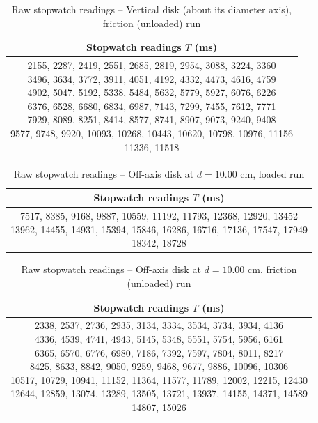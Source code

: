 \begin{table}[htb!]
\centering
\caption{Raw stopwatch readings -- Vertical disk (about its diameter axis), friction (unloaded) run}
\begin{tabular}{c}
\toprule
Stopwatch readings $T$ (\unit{\ms}) \\
\midrule
\makecell{2155, 2287, 2419, 2551, 2685, 2819, 2954, 3088, 3224, 3360 \\ 3496, 3634, 3772, 3911, 4051, 4192, 4332, 4473, 4616, 4759 \\ 4902, 5047, 5192, 5338, 5484, 5632, 5779, 5927, 6076, 6226 \\ 6376, 6528, 6680, 6834, 6987, 7143, 7299, 7455, 7612, 7771 \\ 7929, 8089, 8251, 8414, 8577, 8741, 8907, 9073, 9240, 9408 \\ 9577, 9748, 9920, 10093, 10268, 10443, 10620, 10798, 10976, 11156 \\ 11336, 11518} \\
\bottomrule
\end{tabular}
\end{table}
\begin{table}[htb!]
\centering
\caption{Raw stopwatch readings -- Off-axis disk at $d = 10.00$ cm, loaded run}
\begin{tabular}{c}
\toprule
Stopwatch readings $T$ (\unit{\ms}) \\
\midrule
\makecell{7517, 8385, 9168, 9887, 10559, 11192, 11793, 12368, 12920, 13452 \\ 13962, 14455, 14931, 15394, 15846, 16286, 16716, 17136, 17547, 17949 \\ 18342, 18728} \\
\bottomrule
\end{tabular}
\end{table}
\begin{table}[htb!]
\centering
\caption{Raw stopwatch readings -- Off-axis disk at $d = 10.00$ cm, friction (unloaded) run}
\begin{tabular}{c}
\toprule
Stopwatch readings $T$ (\unit{\ms}) \\
\midrule
\makecell{2338, 2537, 2736, 2935, 3134, 3334, 3534, 3734, 3934, 4136 \\ 4336, 4539, 4741, 4943, 5145, 5348, 5551, 5754, 5956, 6161 \\ 6365, 6570, 6776, 6980, 7186, 7392, 7597, 7804, 8011, 8217 \\ 8425, 8633, 8842, 9050, 9259, 9468, 9677, 9886, 10096, 10306 \\ 10517, 10729, 10941, 11152, 11364, 11577, 11789, 12002, 12215, 12430 \\ 12644, 12859, 13074, 13289, 13505, 13721, 13937, 14155, 14371, 14589 \\ 14807, 15026} \\
\bottomrule
\end{tabular}
\end{table}
